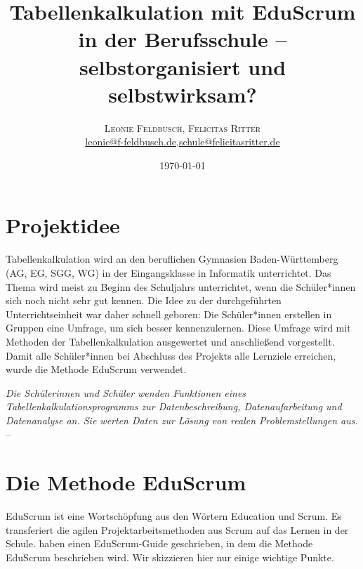 \documentclass[twoside,twocolumn]{article}
\title{Tabellenkalkulation mit EduScrum in der Berufsschule -- selbstorganisiert und selbstwirksam?} %
\author{%
\textsc{Leonie Feldbusch, Felicitas Ritter} \\[1ex] %
\normalsize \href{mailto:leonie@f-feldbusch.de}{leonie@f-feldbusch.de},\href{mailto:schule@felicitasritter.de}{schule@felicitasritter.de} %
}
\date{\today} %
\begin{document}
\maketitle


\section{Projektidee}

Tabellenkalkulation wird an den beruflichen Gymnasien Baden-Württemberg (AG, EG, SGG, WG) in der Eingangsklasse in Informatik unterrichtet. Das Thema wird meist zu Beginn des Schuljahrs unterrichtet, wenn die Schüler*innen sich noch nicht sehr gut kennen. Die Idee zu der durchgeführten Unterrichtseinheit war daher schnell geboren: Die Schüler*innen erstellen in Gruppen eine Umfrage, um sich besser kennenzulernen. Diese Umfrage wird mit Methoden der Tabellenkalkulation ausgewertet und anschließend vorgestellt. Damit alle Schüler*innen bei Abschluss des Projekts alle Lernziele erreichen, wurde die Methode EduScrum verwendet.

\textit{Die Schülerinnen und Schüler wenden Funktionen eines Tabellenkalkulationsprogramms zur Datenbeschreibung, Datenaufarbeitung und Datenanalyse an. Sie werten Daten zur Lösung von realen Problemstellungen aus.} -- \cite{BP}


\section{Die Methode EduScrum}

EduScrum ist eine Wortschöpfung aus den Wörtern Education und Scrum. Es transferiert die agilen Projektarbeitsmethoden aus Scrum auf das Lernen in der Schule. \cite{guide} haben einen EduScrum-Guide geschrieben, in dem die Methode EduScrum beschrieben wird. Wir skizzieren hier nur einige wichtige Punkte.
\end{document}
